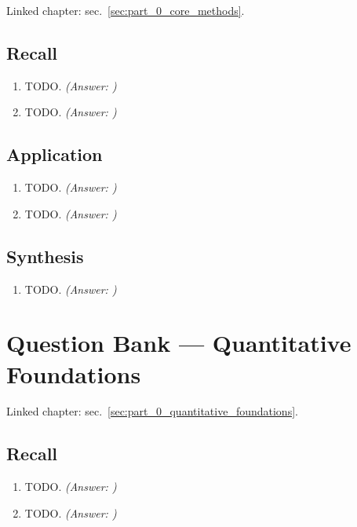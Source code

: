 \documentclass[
]{article}
\theoremstyle{plain}
\theoremstyle{definition}
\begin{document}
Linked chapter: sec.~\ref{sec:part_0_core_methods}.

\subsection{Recall}\label{recall-1}

\begin{enumerate}
\def\labelenumi{\arabic{enumi}.}
\item
  TODO. \emph{(Answer: )}
\item
  TODO. \emph{(Answer: )}
\end{enumerate}

\subsection{Application}\label{application-1}

\begin{enumerate}
\def\labelenumi{\arabic{enumi}.}
\setcounter{enumi}{2}
\item
  TODO. \emph{(Answer: )}
\item
  TODO. \emph{(Answer: )}
\end{enumerate}

\subsection{Synthesis}\label{synthesis-1}

\begin{enumerate}
\def\labelenumi{\arabic{enumi}.}
\setcounter{enumi}{4}
\item
  TODO. \emph{(Answer: )}
\end{enumerate}

\newpage

\section{Question Bank --- Quantitative
Foundations}\label{sec:q_part_0_quantitative_foundations}

Linked chapter: sec.~\ref{sec:part_0_quantitative_foundations}.

\subsection{Recall}\label{recall-2}

\begin{enumerate}
\def\labelenumi{\arabic{enumi}.}
\item
  TODO. \emph{(Answer: )}
\item
  TODO. \emph{(Answer: )}
\end{enumerate}
\end{document}

